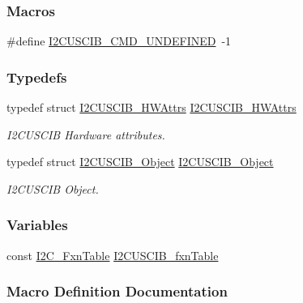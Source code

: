 \subsubsection*{Macros}
\begin{DoxyCompactItemize}
\item 
\#define \hyperlink{_i2_c_u_s_c_i_b_8h_a21807b856cb66a3bf2f0c2bac0674ce7}{I2\-C\-U\-S\-C\-I\-B\-\_\-\-C\-M\-D\-\_\-\-U\-N\-D\-E\-F\-I\-N\-E\-D}~-\/1
\end{DoxyCompactItemize}
\subsubsection*{Typedefs}
\begin{DoxyCompactItemize}
\item 
typedef struct \hyperlink{struct_i2_c_u_s_c_i_b___h_w_attrs}{I2\-C\-U\-S\-C\-I\-B\-\_\-\-H\-W\-Attrs} \hyperlink{_i2_c_u_s_c_i_b_8h_a83f30e87604a576ba053bea4686c9569}{I2\-C\-U\-S\-C\-I\-B\-\_\-\-H\-W\-Attrs}
\begin{DoxyCompactList}\small\item\em I2\-C\-U\-S\-C\-I\-B Hardware attributes. \end{DoxyCompactList}\item 
typedef struct \hyperlink{struct_i2_c_u_s_c_i_b___object}{I2\-C\-U\-S\-C\-I\-B\-\_\-\-Object} \hyperlink{_i2_c_u_s_c_i_b_8h_a4b7b87d6ac61e0808fde0cd44bc2aa08}{I2\-C\-U\-S\-C\-I\-B\-\_\-\-Object}
\begin{DoxyCompactList}\small\item\em I2\-C\-U\-S\-C\-I\-B Object. \end{DoxyCompactList}\end{DoxyCompactItemize}
\subsubsection*{Variables}
\begin{DoxyCompactItemize}
\item 
const \hyperlink{struct_i2_c___fxn_table}{I2\-C\-\_\-\-Fxn\-Table} \hyperlink{_i2_c_u_s_c_i_b_8h_a72eb489c9beee32e652431265a234cbd}{I2\-C\-U\-S\-C\-I\-B\-\_\-fxn\-Table}
\end{DoxyCompactItemize}


\subsubsection{Macro Definition Documentation}
